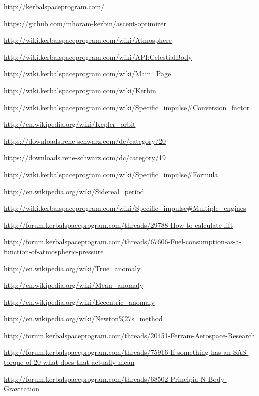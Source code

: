 \documentclass[11pt]{article}
\begin{document}
\begin{thebibliography}{Kerbin}

  \url{http://kerbalspaceprogram.com/}

  \url{https://github.com/mhoram-kerbin/ascent-optimizer}

  \url{http://wiki.kerbalspaceprogram.com/wiki/Atmosphere}

  \url{http://wiki.kerbalspaceprogram.com/wiki/API:CelestialBody}

  \url{http://wiki.kerbalspaceprogram.com/wiki/Main_Page}

  \url{http://wiki.kerbalspaceprogram.com/wiki/Kerbin}

  \url{http://wiki.kerbalspaceprogram.com/wiki/Specific_impulse#Conversion_factor}

  \url{http://en.wikipedia.org/wiki/Kepler_orbit}

  \url{https://downloads.rene-schwarz.com/dc/category/20}

  \url{https://downloads.rene-schwarz.com/dc/category/19}

  \url{http://wiki.kerbalspaceprogram.com/wiki/Specific_impulse#Formula}

  \url{http://en.wikipedia.org/wiki/Sidereal_period}

  \url{http://wiki.kerbalspaceprogram.com/wiki/Specific_impulse#Multiple_engines}

  \url{http://forum.kerbalspaceprogram.com/threads/29788-How-to-calculate-lift}

  \url{http://forum.kerbalspaceprogram.com/threads/67606-Fuel-consumption-as-a-function-of-atmospheric-pressure}

  \url{http://en.wikipedia.org/wiki/True_anomaly}

  \url{http://en.wikipedia.org/wiki/Mean_anomaly}

  \url{http://en.wikipedia.org/wiki/Eccentric_anomaly}

  \url{http://en.wikipedia.org/wiki/Newton\%27s_method}

  \url{http://forum.kerbalspaceprogram.com/threads/20451-Ferram-Aerospace-Research}

  \url{http://forum.kerbalspaceprogram.com/threads/75916-If-something-has-an-SAS-torque-of-20-what-does-that-actually-mean}

  \url{http://forum.kerbalspaceprogram.com/threads/68502-Principia-N-Body-Gravitation}

\end{thebibliography}
\end{document}
